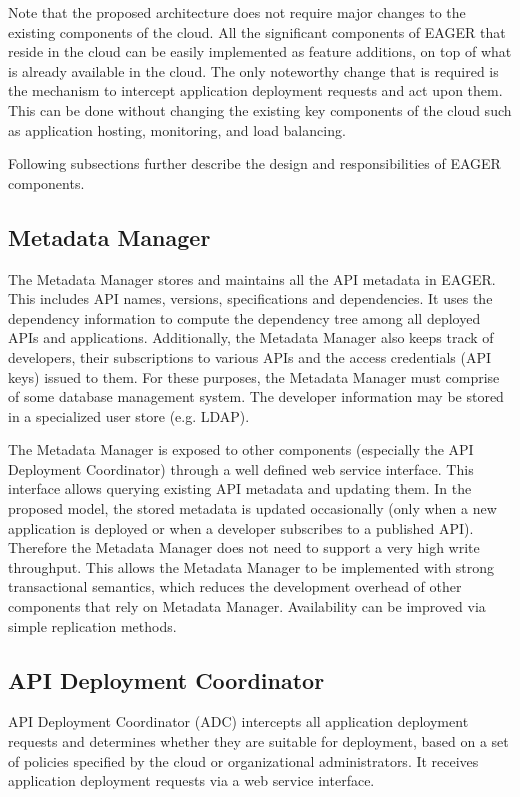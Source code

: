 Note that the proposed architecture does not require major changes to the existing components of the cloud. All the 
significant components of EAGER that reside in the cloud can be easily implemented as feature additions, on top of what is already available 
in the cloud. The only noteworthy change that is required is the mechanism to intercept application deployment requests and act upon them. 
This can be done without changing the existing key components of the cloud such as application hosting, monitoring, and load balancing.

Following subsections further describe the design and responsibilities of EAGER components.

\subsection{Metadata Manager}
The Metadata Manager stores and maintains all the API metadata in EAGER. This includes API names, versions, specifications and dependencies.
It uses the dependency information to compute the dependency tree among all deployed APIs and applications. Additionally, the Metadata Manager
also keeps track of developers, their subscriptions to various APIs and the access credentials (API keys) issued to them. For these purposes,
the Metadata Manager must comprise of some database management system. The developer information may be stored in a specialized user
store (e.g. LDAP).

The Metadata Manager is exposed to other components (especially the API Deployment Coordinator) through a well defined web service interface.
This interface allows querying existing API metadata and updating them. In the proposed model, the stored metadata is updated 
occasionally (only when a new application is deployed or when a developer subscribes to a published API). Therefore the Metadata Manager
does not need to support a very high write throughput. This allows the Metadata Manager to be implemented with strong transactional semantics,
which reduces the development overhead of other components that rely on Metadata Manager. Availability can be improved via
simple replication methods.

\subsection{API Deployment Coordinator}
API Deployment Coordinator (ADC) intercepts all application deployment requests and determines whether they are suitable for deployment, based
on a set of policies specified by the cloud or organizational administrators. It receives application deployment requests via a web service interface.

